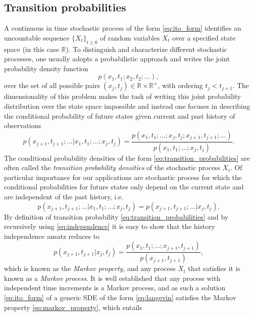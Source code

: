 \subsection{Transition probabilities}\label{subsec:transition_probabilities}
A continuous in time stochastic process of the form \eqref{eq:ito_form} identifies an uncountable sequence $\{X_t\}_{t\geq0}$ of random variables $X_t$ over a specified state space (in this case $\mathbb{R}$).
To distinguish and characterize different stochastic processes, one usually adopts a probabilistic approach and writes the joint probability density function
%
\begin{equation*}
  p(x_1,t_1;x_2,t_2;\dots),
\end{equation*}
%
over the set of all possible pairs $(x_j,t_j)\in \mathbb{R}\times\mathbb{R}^+$, with ordering $t_j<t_{j+1}$.
The dimensionality of this problem makes the task of writing this joint probability distribution over the state space impossible and instead one focuses in describing the conditional probability of future states given current and past history of observations
%
\begin{equation}\label{eq:transition_probabilities}
  p(x_{j+1},t_{j+1};\dots | x_1,t_1;\dots;x_j,t_j) = \frac{p(x_1,t_1;\dots;x_j,t_j;x_{j+1},t_{j+1};\dots)}{p(x_1,t_1;\dots;x_j,t_j)}.
\end{equation}
%
The conditional probability densities of the form \eqref{eq:transition_probabilities} are often called the \emph{transition probability densities} of the stochastic process $X_t$.
Of particular importance for our applications are stochastic process for which the conditional probabilities for future states only depend on the current state and are independent of the past history, i.e.
%
\begin{equation}\label{eq:independence}
  p(x_{j+1},t_{j+1};\dots | x_1,t_1;\dots;x_j,t_j) = p(x_{j+1},t_{j+1};\dots | x_j,t_j).
\end{equation}
%
By definition of transition probability \eqref{eq:transition_probabilities} and by recursively using \eqref{eq:independence} it is easy to show that the history independence ansatz reduces to
%
\begin{equation}\label{eq:markov_property}
  p(x_{j+1},t_{j+1} | x_j,t_j) = \frac{p(x_1,t_1;\dots;x_{j+1},t_{j+1})}{p(x_{j+1},t_{j+1})},
\end{equation}
%
which is known as the \emph{Markov property}, and any process $X_t$ that satisfies it is known as a \emph{Markov process}.
It is well established that any process with independent time increments is a Markov process, and as such a solution \eqref{eq:ito_form} of a generic SDE of the form \eqref{eq:langevin} satisfies the Markov property \eqref{eq:markov_property}, which entails

